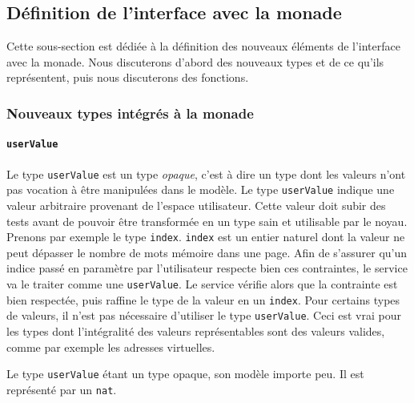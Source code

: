 		\subsection{Définition de l'interface avec la monade}

		Cette sous-section est dédiée à la définition des nouveaux éléments de l'interface avec la monade. Nous discuterons d'abord des nouveaux types et de ce qu'ils représentent, puis nous discuterons des fonctions.

		\subsubsection{Nouveaux types intégrés à la monade}

		\paragraph{\texttt{userValue}} Le type \texttt{userValue} est un type \emph{opaque}, c'est à dire un type dont les valeurs n'ont pas vocation à être manipulées dans le modèle. Le type \texttt{userValue} indique une valeur arbitraire provenant de l'espace utilisateur. Cette valeur doit subir des tests avant de pouvoir être transformée en un type sain et utilisable par le noyau. Prenons par exemple le type \texttt{index}. \texttt{index} est un entier naturel dont la valeur ne peut dépasser le nombre de mots mémoire dans une page. Afin de s'assurer qu'un indice passé en paramètre par l'utilisateur respecte bien ces contraintes, le service va le traiter comme une \texttt{userValue}. Le service vérifie alors que la contrainte est bien respectée, puis raffine le type de la valeur en un \texttt{index}. Pour certains types de valeurs, il n'est pas nécessaire d'utiliser le type \texttt{userValue}. Ceci est vrai pour les types dont l'intégralité des valeurs représentables sont des valeurs valides, comme par exemple les adresses virtuelles.

		Le type \texttt{userValue} étant un type opaque, son modèle importe peu. Il est représenté par un \texttt{nat}.

